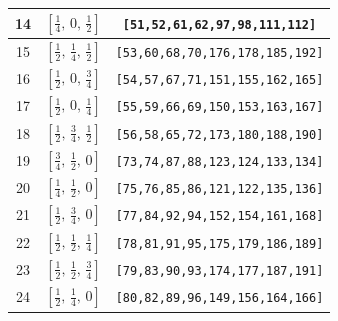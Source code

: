 \documentclass[fleqn,8pt]{jsarticle}
\begin{document}
\begin{longtable}{ccc}
14 & $\left[ \frac{1}{4},\, 0,\, \frac{1}{2} \right]$ & {\tt [51,52,61,62,97,98,111,112]} \\ \hline
15 & $\left[ \frac{1}{2},\, \frac{1}{4},\, \frac{1}{2} \right]$ & {\tt [53,60,68,70,176,178,185,192]} \\ \hline
16 & $\left[ \frac{1}{2},\, 0,\, \frac{3}{4} \right]$ & {\tt [54,57,67,71,151,155,162,165]} \\ \hline
17 & $\left[ \frac{1}{2},\, 0,\, \frac{1}{4} \right]$ & {\tt [55,59,66,69,150,153,163,167]} \\ \hline
18 & $\left[ \frac{1}{2},\, \frac{3}{4},\, \frac{1}{2} \right]$ & {\tt [56,58,65,72,173,180,188,190]} \\ \hline
19 & $\left[ \frac{3}{4},\, \frac{1}{2},\, 0 \right]$ & {\tt [73,74,87,88,123,124,133,134]} \\ \hline
20 & $\left[ \frac{1}{4},\, \frac{1}{2},\, 0 \right]$ & {\tt [75,76,85,86,121,122,135,136]} \\ \hline
21 & $\left[ \frac{1}{2},\, \frac{3}{4},\, 0 \right]$ & {\tt [77,84,92,94,152,154,161,168]} \\ \hline
22 & $\left[ \frac{1}{2},\, \frac{1}{2},\, \frac{1}{4} \right]$ & {\tt [78,81,91,95,175,179,186,189]} \\ \hline
23 & $\left[ \frac{1}{2},\, \frac{1}{2},\, \frac{3}{4} \right]$ & {\tt [79,83,90,93,174,177,187,191]} \\ \hline
24 & $\left[ \frac{1}{2},\, \frac{1}{4},\, 0 \right]$ & {\tt [80,82,89,96,149,156,164,166]} \\
\end{longtable}
\renewcommand{\arraystretch}{1.2}
\end{document}
